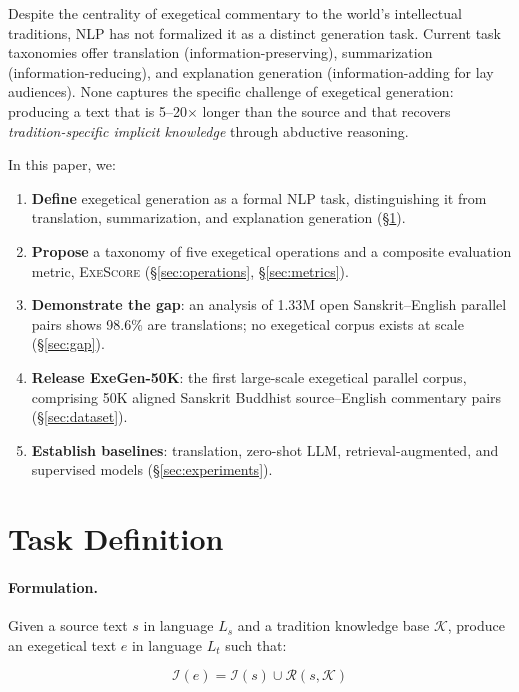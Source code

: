 \documentclass[11pt]{article}
\newcommand{\I}{\mathcal{I}}
\newcommand{\K}{\mathcal{K}}
\newcommand{\R}{\mathcal{R}}
\begin{document}
Despite the centrality of exegetical commentary to the world's intellectual traditions, NLP has not formalized it as a distinct generation task. Current task taxonomies offer translation (information-preserving), summarization (information-reducing), and explanation generation (information-adding for lay audiences). None captures the specific challenge of exegetical generation: producing a text that is 5--20$\times$ longer than the source and that recovers \textit{tradition-specific implicit knowledge} through abductive reasoning.

In this paper, we:
\begin{enumerate}
    \item \textbf{Define} exegetical generation as a formal NLP task, distinguishing it from translation, summarization, and explanation generation (\S\ref{sec:task}).
    \item \textbf{Propose} a taxonomy of five exegetical operations and a composite evaluation metric, \textsc{ExeScore} (\S\ref{sec:operations}, \S\ref{sec:metrics}).
    \item \textbf{Demonstrate the gap}: an analysis of 1.33M open Sanskrit--English parallel pairs shows 98.6\% are translations; no exegetical corpus exists at scale (\S\ref{sec:gap}).
    \item \textbf{Release ExeGen-50K}: the first large-scale exegetical parallel corpus, comprising 50K aligned Sanskrit Buddhist source--English commentary pairs (\S\ref{sec:dataset}).
    \item \textbf{Establish baselines}: translation, zero-shot LLM, retrieval-augmented, and supervised models (\S\ref{sec:experiments}).
\end{enumerate}


\section{Task Definition}
\label{sec:task}

\paragraph{Formulation.}
Given a source text $s$ in language $L_s$ and a tradition knowledge base $\K$, produce an exegetical text $e$ in language $L_t$ such that:

\begin{equation}
    \I(e) = \I(s) \cup \R(s, \K)
\end{equation}
\end{document}
